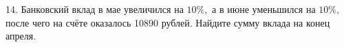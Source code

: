 14. Банковский вклад в мае увеличился на $10\%,$ а в июне уменьшился на $10\%,$ после чего на счёте оказалось 10890 рублей. Найдите сумму вклада на конец апреля.\\
